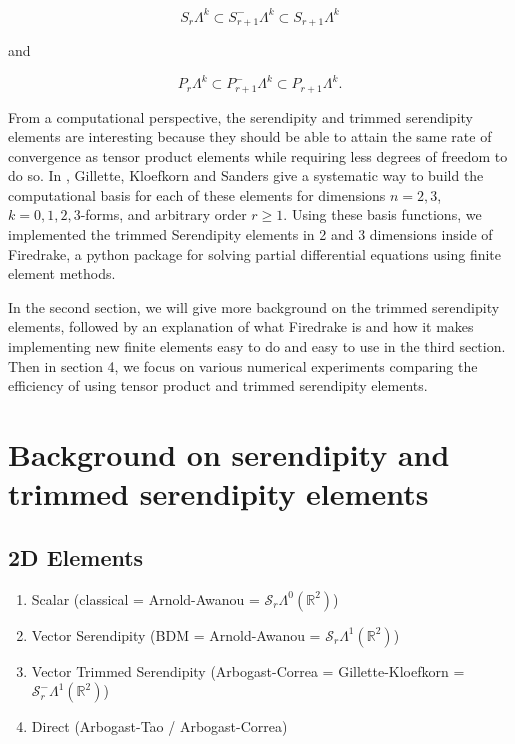 \documentclass[manuscript,screen]{acmart}
\newcommand{\R}{\mathbb{R}}
\newcommand{\calS}{\mathcal{S}}
\begin{document}
  \begin{equation*}
      S_r \Lambda^k \subset S^-_{r+1} \Lambda^k \subset S_{r+1} \Lambda^k
  \end{equation*}
  
 \noindent and 
  
   \begin{equation*}
      P_r \Lambda^k \subset P^-_{r+1} \Lambda^k \subset P_{r+1} \Lambda^k.
  \end{equation*}
  
  From a computational perspective, the serendipity and trimmed serendipity elements are interesting because they should be able to attain the same rate of convergence as tensor product elements while requiring less degrees of freedom to do so.  In \cite{gillette2019computational}, Gillette, Kloefkorn and Sanders give a systematic way to build the computational basis for each of these elements for dimensions $n = 2, 3$, $k=0, 1, 2, 3$-forms, and arbitrary order $r \geq 1$.  Using these basis functions, we implemented the trimmed Serendipity elements in 2 and 3 dimensions inside of Firedrake, a python package for solving partial differential equations using finite element methods.
  
  In the second section, we will give more background on the trimmed serendipity elements, followed by an explanation of what Firedrake is and how it makes implementing new finite elements easy to do and easy to use in the third section.  Then in section 4, we focus on various numerical experiments comparing the efficiency of using tensor product and trimmed serendipity elements.  
  
  \section{Background on serendipity and trimmed serendipity elements}
  
  \subsection{2D Elements}
  \begin{enumerate}
  \item Scalar (classical = Arnold-Awanou = $\calS_r\Lambda^0(\R^2)$)
  \item Vector Serendipity (BDM = Arnold-Awanou = $\calS_r\Lambda^1(\R^2)$)
  \item Vector Trimmed Serendipity (Arbogast-Correa = Gillette-Kloefkorn = $\calS_r^-\Lambda^1(\R^2)$)
  \item Direct (Arbogast-Tao / Arbogast-Correa)
  \end{enumerate}
  
\end{document}
